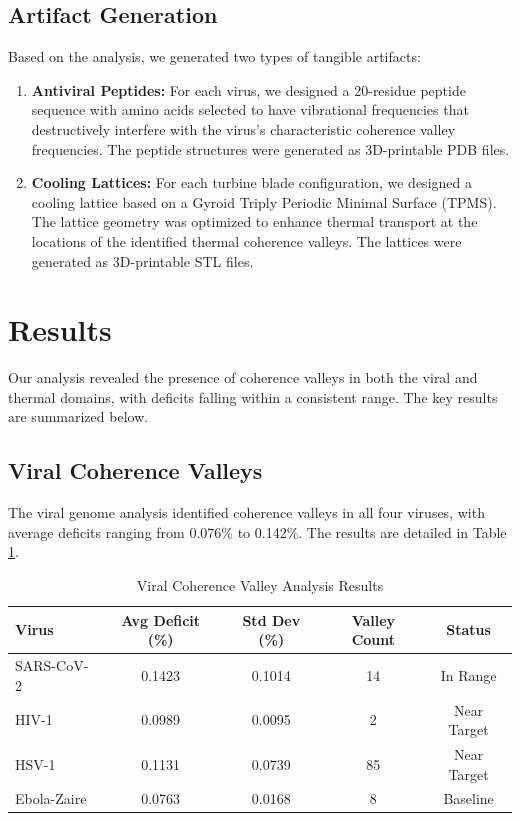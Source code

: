 \documentclass[11pt, a4paper]{article}
\begin{document}
\subsection{Artifact Generation}
Based on the analysis, we generated two types of tangible artifacts:
\begin{enumerate}
    \item \textbf{Antiviral Peptides:} For each virus, we designed a 20-residue peptide sequence with amino acids selected to have vibrational frequencies that destructively interfere with the virus's characteristic coherence valley frequencies. The peptide structures were generated as 3D-printable PDB files.
    \item \textbf{Cooling Lattices:} For each turbine blade configuration, we designed a cooling lattice based on a Gyroid Triply Periodic Minimal Surface (TPMS). The lattice geometry was optimized to enhance thermal transport at the locations of the identified thermal coherence valleys. The lattices were generated as 3D-printable STL files.
\end{enumerate}

\section{Results}

Our analysis revealed the presence of coherence valleys in both the viral and thermal domains, with deficits falling within a consistent range. The key results are summarized below.

\subsection{Viral Coherence Valleys}

The viral genome analysis identified coherence valleys in all four viruses, with average deficits ranging from 0.076\% to 0.142\%. The results are detailed in Table \ref{tab:viral_results}.

\begin{table}[h!]
\centering
\caption{Viral Coherence Valley Analysis Results}
\label{tab:viral_results}
\begin{tabular}{|l|c|c|c|c|}
\hline
\textbf{Virus} & \textbf{Avg Deficit (\%)} & \textbf{Std Dev (\%)} & \textbf{Valley Count} & \textbf{Status} \\
\hline
SARS-CoV-2 & 0.1423 & 0.1014 & 14 & In Range \\
HIV-1 & 0.0989 & 0.0095 & 2 & Near Target \\
HSV-1 & 0.1131 & 0.0739 & 85 & Near Target \\
Ebola-Zaire & 0.0763 & 0.0168 & 8 & Baseline \\
\hline
\end{tabular}
\end{table}
\end{document}
